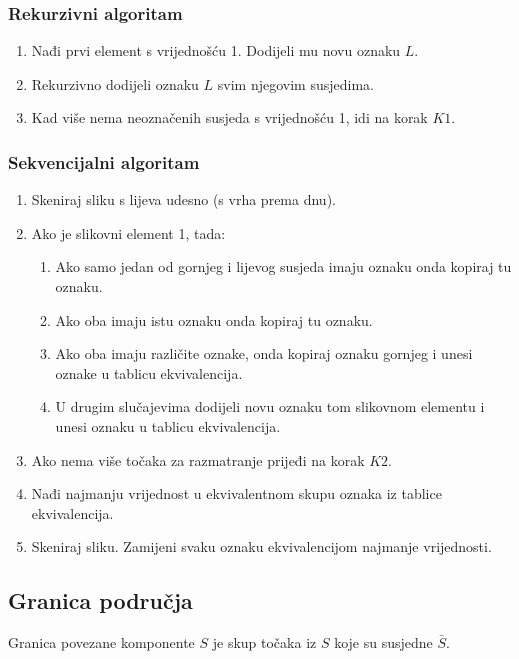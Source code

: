 \documentclass[11pt,english]{article}
\begin{document}
\subsubsection{Rekurzivni algoritam}
\begin{enumerate}
  \item Nađi prvi element s vrijednošću 1. Dodijeli mu novu oznaku $L$.
  \item Rekurzivno dodijeli oznaku $L$ svim njegovim susjedima.
  \item Kad više nema neoznačenih susjeda s vrijednošću 1, idi na korak $K1$.
\end{enumerate}

\subsubsection{Sekvencijalni algoritam}
\begin{enumerate}
  \item Skeniraj sliku s lijeva udesno (s vrha prema dnu).
  \item Ako je slikovni element 1, tada:
  \begin{enumerate}
    \item Ako samo jedan od gornjeg i lijevog susjeda imaju oznaku onda kopiraj tu oznaku.
    \item Ako oba imaju istu oznaku onda kopiraj tu oznaku.
    \item Ako oba imaju različite oznake, onda kopiraj oznaku gornjeg i unesi oznake u tablicu ekvivalencija.
    \item U drugim slučajevima dodijeli novu oznaku tom slikovnom elementu i unesi oznaku u tablicu ekvivalencija.
  \end{enumerate}
  \item Ako nema više točaka za razmatranje prijeđi na korak $K2$.
  \item Nađi najmanju vrijednost u ekvivalentnom skupu oznaka iz tablice ekvivalencija.
  \item Skeniraj sliku. Zamijeni svaku oznaku ekvivalencijom najmanje vrijednosti.
\end{enumerate}

\subsection{Granica područja}
Granica povezane komponente $S$ je skup točaka iz $S$ koje su susjedne $\bar S$.
\end{document}
